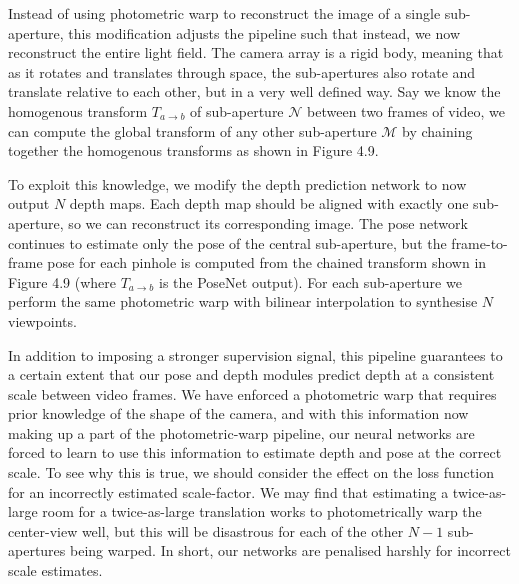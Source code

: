 Instead of using photometric warp to reconstruct the image of a single sub-aperture, this modification adjusts the pipeline such that instead, we now reconstruct the entire light field. The camera array is a rigid body, meaning that as it rotates and translates through space, the sub-apertures also rotate and translate relative to each other, but in a very well defined way. Say we know the homogenous transform  $T_{a \rightarrow b}$ of sub-aperture $\mathcal{N}$ between two frames of video, we can compute the global transform of any other sub-aperture $\mathcal{M}$ by chaining together the homogenous transforms as shown in Figure 4.9.

To exploit this knowledge, we modify the depth prediction network to now output $N$ depth maps. Each depth map should be aligned with exactly one sub-aperture, so we can reconstruct its corresponding image. The pose network continues to estimate only the pose of the central sub-aperture, but the frame-to-frame pose for each pinhole is computed from the chained transform shown in Figure 4.9 (where $T_{a\rightarrow b}$ is the PoseNet output). For each sub-aperture we perform the same photometric warp with bilinear interpolation to synthesise $N$ viewpoints.

In addition to imposing a stronger supervision signal, this pipeline guarantees to a certain extent that our pose and depth modules predict depth at a consistent scale between video frames. We have enforced a photometric warp that requires prior knowledge of the shape of the camera, and with this information now making up a part of the photometric-warp pipeline, our neural networks are forced to learn to use this information to estimate depth and pose at the correct scale. To see why this is true, we should consider the effect on the loss function for an incorrectly estimated scale-factor. We may find that estimating a twice-as-large room for a twice-as-large translation works to photometrically warp the center-view well, but this will be disastrous for each of the other $N-1$ sub-apertures being warped. In short, our networks are penalised harshly for incorrect scale estimates.
